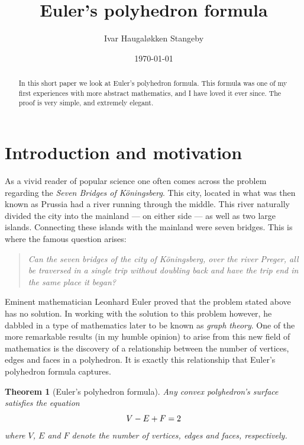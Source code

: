 \documentclass{amsart}
\title{Euler's polyhedron formula}
\author{Ivar Haugal{\o}kken Stangeby}
\date{\today}
\theoremstyle{plain}
\newtheorem{theorem}{Theorem}
\theoremstyle{definition}
\begin{document}
\begin{abstract}
   In this short paper we look at Euler's polyhedron formula. This formula was
   one of my first experiences with more abstract mathematics, and I have loved
   it ever since. The proof is very simple, and extremely elegant.
\end{abstract}
\maketitle

\tableofcontents

\section{Introduction and motivation}
\label{sec:introduction_and_motivation}

As a vivid reader of popular science one often comes across the problem
regarding the \emph{Seven Bridges of K{\"o}ningsberg}. This city, located in
what was then known as Prussia had a river running through the middle. This
river naturally divided the city into the mainland --- on either side --- as
well as two large islands. Connecting these islands with the mainland were
seven bridges. This is where the famous question arises:

\begin{quote}
    \emph{Can the seven bridges of the city of K{\"o}ningsberg, over the river
    Preger, all be traversed in a single trip without doubling back and have
the trip end in the same place it began?}  
\end{quote}

Eminent mathematician Leonhard Euler proved that the problem stated above has
no solution. In working with the solution to this problem however, he dabbled
in a type of mathematics later to be known as \emph{graph theory}. One of the
more remarkable results (in my humble opinion) to arise from this new field of
mathematics is the discovery of a relationship between the number of vertices,
edges and faces in a polyhedron. It is exactly this relationship that Euler's
polyhedron formula captures.

\begin{theorem}[Euler's polyhedron formula]
    Any convex polyhedron's surface satisfies the equation
    \begin{equation}
        \notag
        V - E + F = 2
    \end{equation}
    where $V$, $E$ and $F$ denote the number of vertices, edges and faces,
    respectively.
\end{theorem}
\end{document}
